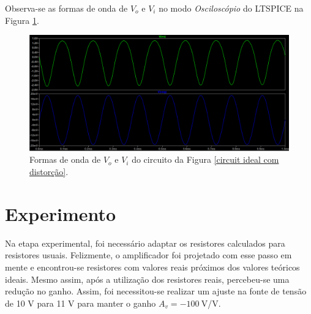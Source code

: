 \documentclass[journal, a4paper]{IEEEtran}
\begin{document}
    \tab Observa-se as formas de onda de $V_o$ e $V_i$ no modo \textit{Osciloscópio} do  LT{\ssmall SPICE} na Figura \ref{osciloscopio ideal com distorção}.
        \begin{figure}[H]
    		\begin{center}
    		\includegraphics[width=\columnwidth]{Av_ideal_distorcao2.PNG}
    		\caption{Formas de onda de $V_o$ e $V_i$ do circuito da Figura \ref{circuit ideal com distorção}.}
    		\label{osciloscopio ideal com distorção}
    		\end{center}
    	\end{figure}
        
\section{Experimento}
    \tab Na etapa experimental, foi necessário adaptar os resistores calculados para resistores usuais. Felizmente, o amplificador foi projetado com esse passo em mente e encontrou-se resistores com valores reais próximos dos valores teóricos ideais. Mesmo assim, após a utilização dos resistores reais, percebeu-se uma redução no ganho. Assim, foi necessitou-se realizar um ajuste na fonte de tensão de 10 V para 11 V para manter o ganho $A_v = -100 \:$V/V.
    
\end{document}

